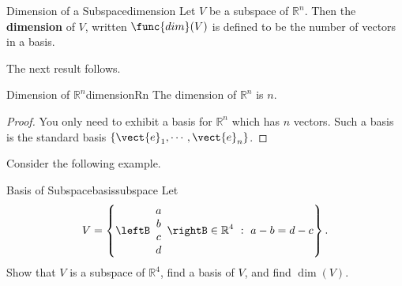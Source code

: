 \begin{definition}{Dimension of a Subspace}{dimension}
Let $V$ be a subspace of $\mathbb{R}^{n}$. Then the \textbf{dimension }of $V$, written $\func{dim}(V)$
is defined to be the number of vectors in a basis.  
\end{definition}

The next result follows.

\begin{corollary}{Dimension of $\mathbb{R}^n$}{dimensionRn}
The dimension of $\mathbb{R}^{n}$ is $n.$ 
\end{corollary}

\begin{proof}
You only need to exhibit a basis for $\mathbb{R}^{n}$ which
has $n$ vectors. Such a basis is the standard basis $\left\{ \vect{e}_{1},\cdots , \vect{e}_{n}\right\} $.
\end{proof}

Consider the following example.

\begin{example}{Basis of Subspace}{basissubspace}
Let 
\[ V=\left\{
\leftB\begin{array}{c} a\\ b\\ c\\ d\end{array}\rightB\in\mathbb{R}^4
~:~ a-b=d-c \right\}.\]
Show that $V$ is a subspace of $\mathbb{R}^4$,
find a basis of $V$, and find $\dim(V)$.
\end{example}

